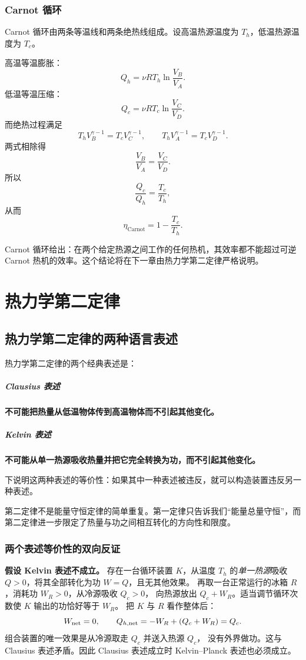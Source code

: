 \documentclass[11pt,a4paper,openany]{ctexbook}
\begin{document}
\subsection*{Carnot 循环}
Carnot 循环由两条等温线和两条绝热线组成。设高温热源温度为 $T_h$，低温热源温度为 $T_c$。

高温等温膨胀：
\[
Q_h=\nu RT_h\ln\frac{V_B}{V_A}.
\]
低温等温压缩：
\[
Q_c=\nu RT_c\ln\frac{V_C}{V_D}.
\]
而绝热过程满足
\[
T_hV_B^{\gamma-1}=T_cV_C^{\gamma-1},
\qquad
T_hV_A^{\gamma-1}=T_cV_D^{\gamma-1}.
\]
两式相除得
\[
\frac{V_B}{V_A}=\frac{V_C}{V_D}.
\]
所以
\[
\frac{Q_c}{Q_h}=\frac{T_c}{T_h},
\]
从而
\[
\boxed{\eta_{\mathrm{Carnot}}=1-\frac{T_c}{T_h}}.
\]

\begin{keybox}
Carnot 循环给出：在两个给定热源之间工作的任何热机，其效率都不能超过可逆 Carnot 热机的效率。这个结论将在下一章由热力学第二定律严格说明。
\end{keybox}

\chapter{热力学第二定律}

\section{热力学第二定律的两种语言表述}
热力学第二定律的两个经典表述是：

\paragraph{Clausius 表述}
\textbf{不可能把热量从低温物体传到高温物体而不引起其他变化。}

\paragraph{Kelvin 表述}
\textbf{不可能从单一热源吸收热量并把它完全转换为功，而不引起其他变化。}

下说明这两种表述的等价性：如果其中一种表述被违反，就可以构造装置违反另一种表述。

\begin{notebox}
第二定律不是能量守恒定律的简单重复。第一定律只告诉我们“能量总量守恒”，而第二定律进一步限定了热量与功之间相互转化的方向性和限度。
\end{notebox}


\subsection*{两个表述等价性的双向反证}
\textbf{假设 Kelvin 表述不成立。}
存在一台循环装置 $K$，从温度 $T_h$ 的\emph{单一热源}吸收 $Q>0$，将其全部转化为功 $W=Q$，且无其他效果。
再取一台正常运行的冰箱 $R$，消耗功 $W_R>0$，从冷源吸收 $Q_c>0$，
向热源放出 $Q_c+W_R$。适当调节循环次数使 $K$ 输出的功恰好等于 $W_R$。
把 $K$ 与 $R$ 看作整体后：
\[
W_{\rm net}=0,\qquad Q_{h,\rm net}=-W_R+(Q_c+W_R)=Q_c.
\]
组合装置的唯一效果是从冷源取走 $Q_c$ 并送入热源 $Q_c$，
没有外界做功。这与 Clausius 表述矛盾。因此 Clausius 表述成立时 Kelvin--Planck 表述也必须成立。
\end{document}
